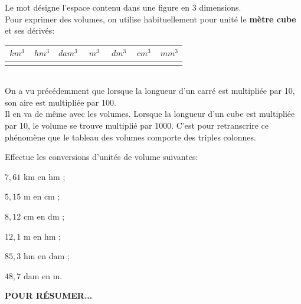 \begin{aconnaitre}
Le mot  désigne l'espace contenu dans une figure en 3 dimensions.\\
Pour exprimer des volumes, on utilise habituellement pour unité le \textbf{\textcolor{H1}{mètre cube}} et ses dérivés:
\begin{center}
    \begin{tabular}{|c|c|c|c|c|c|c|c|c|c|c|c|c|c|c|c|c|c|c|c|c|}
     \hline
     \multicolumn{3}{|c|}{$km^3$} & 
     \multicolumn{3}{c|}{$hm^3$} &
     \multicolumn{3}{c|}{$dam^3$} & 
     \multicolumn{3}{c|}{$m^3$} & 
     \multicolumn{3}{c|}{$dm^3$}  & 
     \multicolumn{3}{c|}{$cm^3$}  & 
     \multicolumn{3}{c|}{$mm^3$}  \\    \hline
         & & & & & & & & & & & & & & & & & & & & \\
    \hline
    \end{tabular}
\end{center}
\end{aconnaitre}

\begin{methode*1}
\begin{exemple*1}\\
On a vu précédemment que lorsque la longueur d'un carré est multipliée par 10, son aire est multipliée par 100.\\
Il en va de même avec les volumes. Lorsque la longueur d'un cube est multipliée par 10, le volume se trouve multiplié par 1000. C'est pour retranscrire ce phénomène que le tableau des volumes comporte des triples colonnes.
\end{exemple*1}
\exercice
Effectue les conversions d'unités de volume suivantes:
\begin{colenumerate}{3}
 \item $7,61$ km en hm ;
 \item $5,15$ m en cm ;
 \item $8,12$ cm  en dm ;
 \item $12,1$ m en hm ;
 \item $85,3$ hm en dam ;
 \item $48,7$ dam en m.
 \end{colenumerate}
\end{methode*1}


\begin{center}
    \textsc{\textbf{POUR RÉSUMER...}}\\
    
\end{center}

